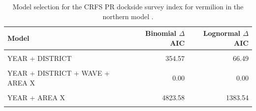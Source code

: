 \documentclass[
  english,
  a4paper,
]{article}
\begin{document}
\begin{table}

\caption{\label{tab:tab-model-select-crfspr}Model selection for the CRFS PR dockside survey index for vermilion in the northern model .}
\centering
\begin{tabular}[t]{lrr}
\toprule
Model & Binomial $\Delta$AIC & Lognormal $\Delta$AIC\\
\midrule
\cellcolor{gray!6}{1} & \cellcolor{gray!6}{5449.55} & \cellcolor{gray!6}{1685.78}\\
YEAR + DISTRICT & 354.57 & 66.49\\
\cellcolor{gray!6}{YEAR + DISTRICT + WAVE} & \cellcolor{gray!6}{327.23} & \cellcolor{gray!6}{24.39}\\
YEAR + DISTRICT + WAVE + AREA X & 0.00 & 0.00\\
\cellcolor{gray!6}{YEAR + WAVE + AREA X} & \cellcolor{gray!6}{4546.50} & \cellcolor{gray!6}{1301.84}\\
\addlinespace
YEAR + AREA X & 4823.58 & 1383.54\\
\cellcolor{gray!6}{YEAR + DISTRICT + AREA X} & \cellcolor{gray!6}{26.81} & \cellcolor{gray!6}{40.90}\\
\bottomrule
\end{tabular}
\end{table}

\FloatBarrier
\end{document}
